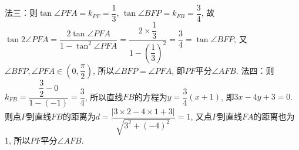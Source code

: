 \begin{question}[points=15]
\begin{solution}
法三：则$\tan\angle PFA = k_{PF} = \dfrac{1}{3}$, $\tan\angle BFP = k_{FB} = \dfrac{3}{4}$, 故$\tan 2\angle PFA = \dfrac{2\tan\angle PFA}{1 - \tan^2\angle PFA} = \dfrac{2 \times \dfrac{1}{3}}{1 - \left(\dfrac{1}{3}\right)^2} = \dfrac{3}{4} = \tan\angle BFP$, 又$\angle BFP, \angle PFA \in (0, \dfrac{\pi}{2})$, 所以$\angle BFP = \angle PFA$, 即$PF$平分$\angle AFB$.
法四：则$k_{FB} = \dfrac{\dfrac{3}{2} - 0}{1 - (-1)} = \dfrac{3}{4}$, 所以直线$FB$的方程为$y = \dfrac{3}{4}(x+1)$, 即$3x - 4y + 3 = 0$. 则点$P$到直线$FB$的距离为$d = \dfrac{|3 \times 2 - 4 \times 1 + 3|}{\sqrt{3^2 + (-4)^2}} = 1$, 又点$P$到直线$FA$的距离也为1, 所以$PF$平分$\angle AFB$.
\end{solution}
\end{question}


